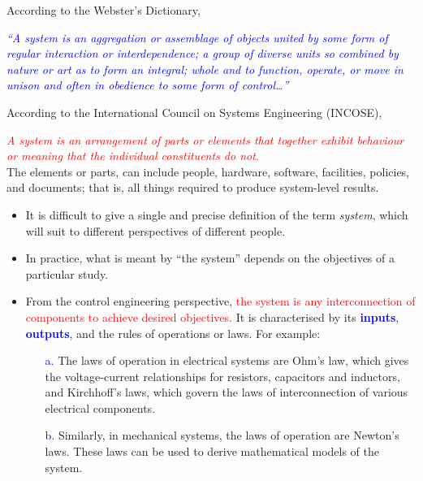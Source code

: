 \documentclass[
  12pt,
  a4paper,
]{report}
\newcommand{\bluetext}[1]{\textcolor{blue}{#1}}
\newcommand{\redtext}[1]{\textcolor{red}{#1}}
\begin{document}
According to the Webster's Dictionary, \\
\begin{mdframed}
    \begin{center}
        \textcolor{blue}{%
            \emph{``A system is an aggregation or assemblage of objects united by some form of regular interaction or interdependence; a group of diverse units so combined by nature or art as to form an integral; whole and to function, operate, or move in unison and often in obedience to some form of control\dots''}}
    \end{center}
\end{mdframed}\label{fig:system-def-webster}
According to the International Council on Systems Engineering (INCOSE),\\
\begin{mdframed}
    \begin{center}
        \redtext{%
            \emph{A system is an arrangement of parts or elements that together exhibit behaviour or meaning that the individual constituents do not.}}\\ The elements or parts, can include people, hardware, software, facilities, policies, and documents; that is, all things required to produce system-level results.
    \end{center}
\end{mdframed}\label{fig:system-def-incose}
\begin{center}
    \begin{itemize}
        \item It is difficult to give a single and precise definition of the term \emph{system}, which will suit to different perspectives of different people. \\
        \item In practice, what is meant by ``the system'' depends on the objectives of a particular study.\\
        \item From the control engineering perspective, \redtext{the system is any interconnection of components to achieve desired objectives.} It is characterised by its \bluetext{\textbf{inputs}}, \bluetext{\textbf{outputs}}, and the rules of operations or laws. For example:
              \begin{itemize}
                  \item[\bluetext{a.}] The laws of operation in electrical systems are Ohm's law, which gives the voltage-current relationships for resistors, capacitors and inductors, and Kirchhoff's laws, which govern the laws of interconnection of various electrical components.
                  \item[\bluetext{b.}] Similarly, in mechanical systems, the laws of operation are Newton's laws. These laws can be used to derive mathematical models of the system.
              \end{itemize}
    \end{itemize}
\end{center}
\newpage
\end{document}
